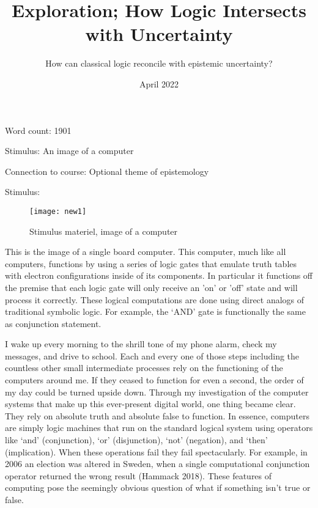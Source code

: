 \documentclass{article}
\title{Exploration; How Logic Intersects with Uncertainty}
\author{How can classical logic reconcile with epistemic uncertainty?}
\date{April 2022}
\begin{document}
\begin{titlepage}
\maketitle

\begin{center}
Word count: 1901

Stimulus: An image of a computer 

Connection to course: Optional theme of epistemology
\end{center}
\thispagestyle{empty}
\end{titlepage}

\begin{center}
{\huge Stimulus:}


\begin{figure}[h]
    \centering
    \texttt{[image: new1]}
    \caption{Stimulus materiel, image of a computer}
    \label{fig:mesh1}
\end{figure}


\end{center}
This is the image of a single board computer. This computer, much like all computers, functions by using a series of logic gates that emulate truth tables with electron configurations inside of its components. In particular it functions off the premise that each logic gate will only receive an 'on' or 'off' state and will process it correctly. These logical computations are done using direct analogs of traditional symbolic logic. For example, the ‘AND’ gate is functionally the same as conjunction statement.

\newpage

I wake up every morning to the shrill tone of my phone alarm, check my messages, and drive to school. Each and every one of those steps including the countless other small intermediate processes rely on the functioning of the computers around me. If they ceased to function for even a second, the order of my day could be turned upside down. Through my investigation of the computer systems that make up this ever-present digital world, one thing became clear. They rely on absolute truth and absolute false to function. In essence, computers are simply logic machines that run on the standard logical system using operators like ‘and’ (conjunction), ‘or’ (disjunction), ‘not’ (negation), and ‘then’ (implication). When these operations fail they fail spectacularly. For example, in 2006 an election was altered in Sweden, when a single computational conjunction operator returned the wrong result (Hammack 2018). These features of computing pose the seemingly obvious question of what if something isn’t true or false.
\end{document}
